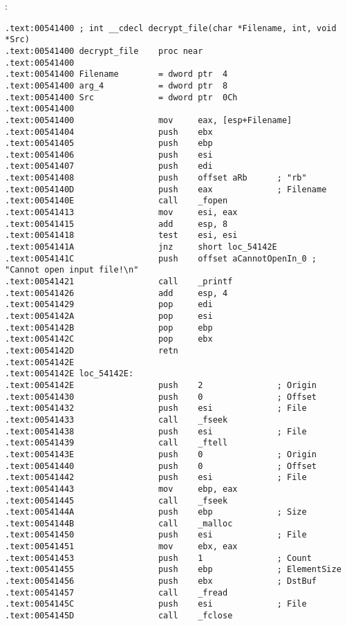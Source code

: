 :

\begin{lstlisting}
.text:00541400 ; int __cdecl decrypt_file(char *Filename, int, void *Src)
.text:00541400 decrypt_file    proc near
.text:00541400
.text:00541400 Filename        = dword ptr  4
.text:00541400 arg_4           = dword ptr  8
.text:00541400 Src             = dword ptr  0Ch
.text:00541400
.text:00541400                 mov     eax, [esp+Filename]
.text:00541404                 push    ebx
.text:00541405                 push    ebp
.text:00541406                 push    esi
.text:00541407                 push    edi
.text:00541408                 push    offset aRb      ; "rb"
.text:0054140D                 push    eax             ; Filename
.text:0054140E                 call    _fopen
.text:00541413                 mov     esi, eax
.text:00541415                 add     esp, 8
.text:00541418                 test    esi, esi
.text:0054141A                 jnz     short loc_54142E
.text:0054141C                 push    offset aCannotOpenIn_0 ; "Cannot open input file!\n"
.text:00541421                 call    _printf
.text:00541426                 add     esp, 4
.text:00541429                 pop     edi
.text:0054142A                 pop     esi
.text:0054142B                 pop     ebp
.text:0054142C                 pop     ebx
.text:0054142D                 retn
.text:0054142E
.text:0054142E loc_54142E:
.text:0054142E                 push    2               ; Origin
.text:00541430                 push    0               ; Offset
.text:00541432                 push    esi             ; File
.text:00541433                 call    _fseek
.text:00541438                 push    esi             ; File
.text:00541439                 call    _ftell
.text:0054143E                 push    0               ; Origin
.text:00541440                 push    0               ; Offset
.text:00541442                 push    esi             ; File
.text:00541443                 mov     ebp, eax
.text:00541445                 call    _fseek
.text:0054144A                 push    ebp             ; Size
.text:0054144B                 call    _malloc
.text:00541450                 push    esi             ; File
.text:00541451                 mov     ebx, eax
.text:00541453                 push    1               ; Count
.text:00541455                 push    ebp             ; ElementSize
.text:00541456                 push    ebx             ; DstBuf
.text:00541457                 call    _fread
.text:0054145C                 push    esi             ; File
.text:0054145D                 call    _fclose
\end{lstlisting}

